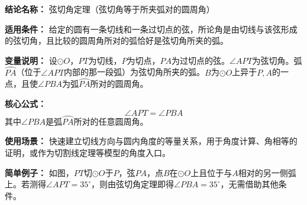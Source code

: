 \textbf{结论名称：} 弦切角定理（弦切角等于所夹弧对的圆周角）

\textbf{适用条件：} 给定的圆有一条切线和一条过切点的弦，所论角是由切线与该弦形成的弦切角，且比较的圆周角所对的弧恰好是弦切角所夹的弧。

\textbf{变量说明：} 设$\odot O$，$PT$为切线，$P$为切点，$PA$为过切点的弦。$\angle APT$为弦切角。弧$\wideparen{PA}$（位于$\angle APT$内部的那一段弧）为弦切角所夹的弧。$B$为$\odot O$上异于$P,A$的一点，且使$\angle PBA$为弧$\wideparen{PA}$所对的圆周角。

\textbf{核心公式：} \[ \boxed{\angle APT = \angle PBA} \] 其中$\angle PBA$是弧$\wideparen{PA}$所对的任意圆周角。

\textbf{使用场景：} 快速建立切线方向与圆内角度的等量关系，用于角度计算、角相等的证明，或作为切割线定理等模型的角度入口。

\textbf{简单例子：} 如图，$PT$切$\odot O$于$P$，弦$PA$，点$B$在$\odot O$上且位于与$A$相对的另一侧弧上。若测得$\angle APT = 35^\circ$，则由弦切角定理即得$\angle PBA = 35^\circ$，无需借助其他条件。